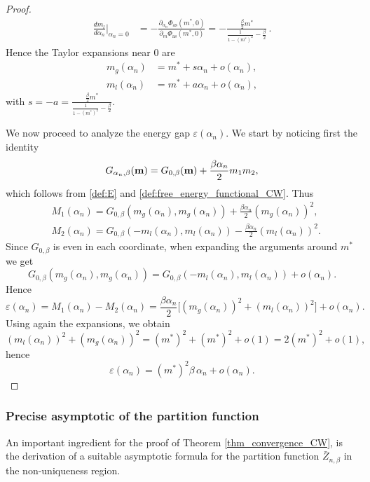 \documentclass[11pt,oneside]{amsart}
\numberwithin{equation}{section}  %
\theoremstyle{plain}
\theoremstyle{remark}
\def \bm {{\bf m}}
\begin{document}
\begin{proof}
\begin{align*}
\frac{d m_l}{d\alpha_n}\Big|_{\alpha_n=0}
&=
-\frac{\partial_{\alpha_n} \Phi_{\mathrm{as}}(m^*,0)}
{\partial_m \Phi_{\mathrm{as}}(m^*,0)}
=
-\frac{\frac{\beta}{2}m^*}
{\frac{1}{1-(m^*)^2}-\frac{\beta}{2}}\,.
\end{align*}
Hence the Taylor expansions near $0$ are
\begin{equation}\label{eq:expansion_mstar}
\begin{split}
m_g(\alpha_n)
&= m^* + s\alpha_n + o(\alpha_n),
\\[2mm]
m_l(\alpha_n)
&= m^* + a\alpha_n + o(\alpha_n),
\end{split}
\end{equation}
with $s=-a=\frac{\frac{\beta}{2}m^*}
{\frac{1}{1-(m^*)^2}-\frac{\beta}{2}}$.

\medskip

We now proceed to analyze the energy gap $\varepsilon(\alpha_n).$ We start by noticing first the identity
\begin{equation*}
G_{\alpha_n,\beta}(\bm)
=
G_{0,\beta}(\bm)
+\frac{\beta\alpha_n}{2}m_1 m_2,
\end{equation*}
which follows from \eqref{def:E} and \eqref{def:free_energy_functional_CW}. Thus
\begin{align*}
&M_1(\alpha_n) = 
G_{0,\beta}(m_g(\alpha_n),m_g(\alpha_n))
+\frac{\beta\alpha_n}{2}(m_g(\alpha_n))^2,\\
&M_2(\alpha_n) =
G_{0,\beta}(-m_l(\alpha_n),m_l(\alpha_n))
-\frac{\beta\alpha_n}{2}(m_l(\alpha_n))^2.
\end{align*}
Since $G_{0,\beta}$ is even in each coordinate, when expanding the arguments around $m^*$ we get
\[
G_{0,\beta}(m_g(\alpha_n),m_g(\alpha_n))
=
G_{0,\beta}(-m_l(\alpha_n),m_l(\alpha_n))+o(\alpha_n).
\]
Hence
\begin{equation*}
\varepsilon(\alpha_n) = M_1(\alpha_n) - M_2(\alpha_n)
=
\frac{\beta\alpha_n}{2}\Big[(m_g(\alpha_n))^2 + (m_l(\alpha_n))^2\Big]
+o(\alpha_n).
\end{equation*}
Using again the expansions, we obtain
\[
(m_l(\alpha_n))^2+(m_g(\alpha_n))^2
=
(m^*)^2+(m^*)^2 + o(1)
=
2(m^*)^2+o(1),
\]
hence
\[
\varepsilon(\alpha_n)
=
(m^*)^2 \beta \, \alpha_n + o(\alpha_n).
\]
\end{proof}


\subsubsection{Precise asymptotic of the partition function}
An important ingredient for the proof of Theorem \ref{thm_convergence_CW}, is the
derivation of a suitable asymptotic formula for the partition function $\bar{Z}_{n,\beta}$
in the non-uniqueness region. 
\end{document}
